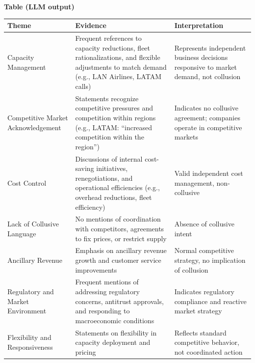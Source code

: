 \documentclass[12pt]{article}
\begin{document}
\textbf{Table (LLM output)}
\begin{table}[ht]
\centering
\footnotesize
\begin{tabular}{p{}p{}p{}}
\toprule
Theme & Evidence & Interpretation \\
\midrule
Capacity Management & Frequent references to capacity reductions, fleet rationalizations, and flexible adjustments to match demand (e.g., LAN Airlines, LATAM calls) & Represents independent business decisions responsive to market demand, not collusion \\
Competitive Market Acknowledgement & Statements recognize competitive pressures and competition within regions (e.g., LATAM: ``increased competition within the region'') & Indicates no collusive agreement; companies operate in competitive markets \\
Cost Control & Discussions of internal cost-saving initiatives, renegotiations, and operational efficiencies (e.g., overhead reductions, fleet efficiency) & Valid independent cost management, non-collusive \\
Lack of Collusive Language & No mentions of coordination with competitors, agreements to fix prices, or restrict supply & Absence of collusive intent \\
Ancillary Revenue & Emphasis on ancillary revenue growth and customer service improvements & Normal competitive strategy, no implication of collusion \\
Regulatory and Market Environment & Frequent mentions of addressing regulatory concerns, antitrust approvals, and responding to macroeconomic conditions & Indicates regulatory compliance and reactive market strategy \\
Flexibility and Responsiveness & Statements on flexibility in capacity deployment and pricing & Reflects standard competitive behavior, not coordinated action \\
\bottomrule
\end{tabular}
\end{table}
\end{document}

